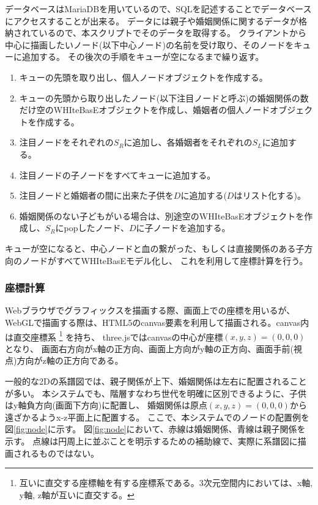 データベースはMariaDBを用いているので、SQLを記述することでデータベースにアクセスすることが出来る。
データには親子や婚姻関係に関するデータが格納されているので、本スクリプトでそのデータを取得する。
クライアントから中心に描画したいノード(以下中心ノード)の名前を受け取り、そのノードをキューに追加する。
その後次の手順をキューが空になるまで繰り返す。
\begin{enumerate}
    \item キューの先頭を取り出し、個人ノードオブジェクトを作成する。
    \item キューの先頭から取り出したノード(以下注目ノードと呼ぶ)の婚姻関係の数だけ空のWHIteBasEオブジェクトを作成し、婚姻者の個人ノードオブジェクトを作成する。
    \item 注目ノードをそれぞれの$S_R$に追加し、各婚姻者をそれぞれの$S_L$に追加する。
    \item 注目ノードの子ノードをすべてキューに追加する。
    \item 注目ノードと婚姻者の間に出来た子供を$D$に追加する($D$はリスト化する)。
    \item 婚姻関係のない子どもがいる場合は、別途空のWHIteBasEオブジェクトを作成し、$S_R$にpopしたノード、$D$に子ノードを追加する。
\end{enumerate}
キューが空になると、中心ノードと血の繋がった、もしくは直接関係のある子方向のノードがすべてWHIteBasEモデル化し、
これを利用して座標計算を行う。

\subsubsection{座標計算}\label{tag:coord}
Webブラウザでグラフィックスを描画する際、画面上での座標を用いるが、
WebGLで描画する際は、HTML5のcanvas要素を利用して描画される。canvas内は直交座標系
\footnote{互いに直交する座標軸を有する座標系である。3次元空間内においては、x軸, y軸, z軸が互いに直交する。}
を持ち、
three.jsではcanvasの中心が座標$(x, y, z) = (0, 0, 0)$となり、
画面右方向がx軸の正方向、画面上方向がy軸の正方向、画面手前(視点)方向がz軸の正方向である。

一般的な2Dの系譜図では、親子関係が上下、婚姻関係は左右に配置されることが多い。
本システムでも、階層すなわち世代を明確に区別できるように、子供はy軸負方向(画面下方向)に配置し、
婚姻関係は原点$(x, y, z) = (0, 0, 0)$から遠ざかるようx-z平面上に配置する。
ここで、本システムでのノードの配置例を図\ref{fig:node}に示す。
図\ref{fig:node}において、赤線は婚姻関係、青線は親子関係を示す。
点線は円周上に並ぶことを明示するための補助線で、実際に系譜図に描画されるものではない。

